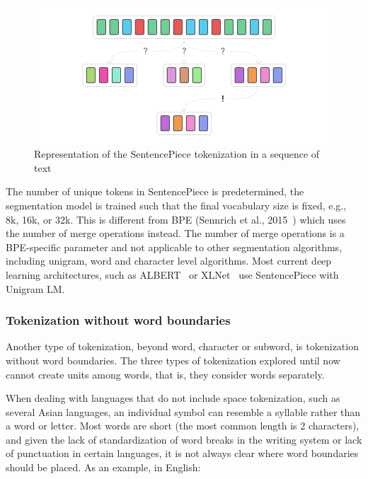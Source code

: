 \begin{figure}[!ht]
    \centering
    \includegraphics[width=14cm]{figures/sentencepiece.png}
    \caption{Representation of the SentencePiece tokenization in a sequence of text}
\end{figure}

The number of unique tokens in SentencePiece is predetermined, the segmentation model is trained such that the final vocabulary size is fixed, e.g., 8k, 16k, or 32k. This is different from BPE (Sennrich et al., 2015~\cite{sennrich2015neural}) which uses the number of merge operations instead. The number of merge operations is a BPE-specific parameter and not applicable to other segmentation algorithms, including unigram, word and character level algorithms. Most current deep learning architectures, such as ALBERT~\cite{lan2019albert} or XLNet~\cite{yang2019xlnet} use SentencePiece with Unigram LM.

\subsubsection{Tokenization without word boundaries}\label{subsec:wordtokwowb}

Another type of tokenization, beyond word, character or subword, is tokenization without word boundaries. The three types of tokenization explored until now cannot create units among words, that is, they consider words separately.

When dealing with languages that do not include space tokenization, such as several Asian languages, an individual symbol can resemble a syllable rather than a word or letter. Most words are short (the most common length is 2 characters), and given the lack of standardization of word breaks in the writing system or lack of punctuation in certain languages, it is not always clear where word boundaries should be placed. As an example, in English:


